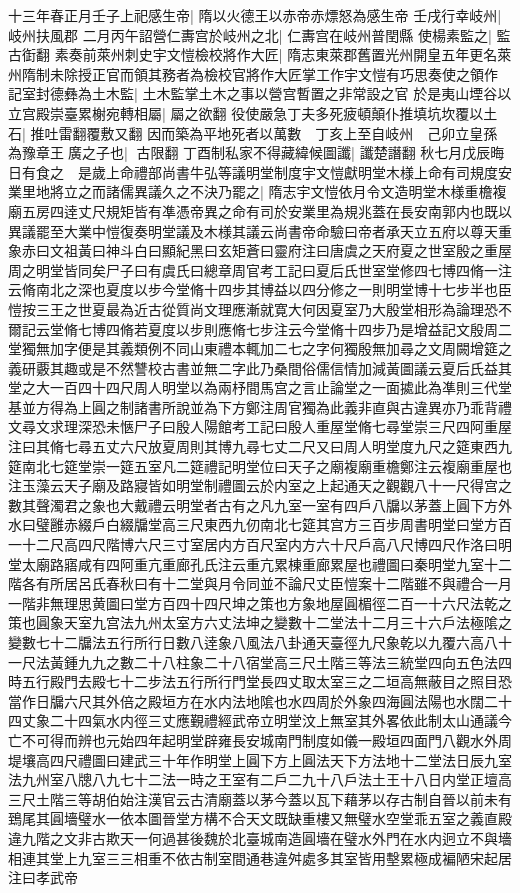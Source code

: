 十三年春正月壬子上祀感生帝|{
	隋以火德王以赤帝赤熛怒為感生帝}
壬戌行幸岐州|{
	岐州扶風郡}
二月丙午詔營仁夀宫於岐州之北|{
	仁夀宫在岐州普閏縣}
使楊素監之|{
	監古衘翻}
素奏前萊州刺史宇文愷檢校將作大匠|{
	隋志東萊郡舊置光州開皇五年更名萊州隋制未除授正官而領其務者為檢校官將作大匠掌工作宇文愷有巧思奏使之領作}
記室封德彝為土木監|{
	土木監掌土木之事以營宫暫置之非常設之官}
於是夷山堙谷以立宫殿崇臺累榭宛轉相屬|{
	屬之欲翻}
役使嚴急丁夫多死疲頓顛仆推填坑坎覆以土石|{
	推吐雷翻覆敷又翻}
因而築為平地死者以萬數　丁亥上至自岐州　己卯立皇孫為豫章王廣之子也|{
	古限翻}
丁酉制私家不得藏緯候圖讖|{
	讖楚譖翻}
秋七月戊辰晦日有食之　是歲上命禮部尚書牛弘等議明堂制度宇文愷獻明堂木様上命有司規度安業里地將立之而諸儒異議久之不決乃罷之|{
	隋志宇文愷依月令文造明堂木様重檐複廟五房四逹丈尺規矩皆有凖憑帝異之命有司於安業里為規兆蓋在長安南郭内也既以異議罷至大業中愷復奏明堂議及木様其議云尚書帝命驗曰帝者承天立五府以尊天重象赤曰文祖黃曰神斗白曰顯紀黑曰玄矩蒼曰靈府注曰唐虞之天府夏之世室殷之重屋周之明堂皆同矣尸子曰有虞氏曰總章周官考工記曰夏后氏世室堂修四七博四脩一注云脩南北之深也夏度以步今堂脩十四步其博益以四分修之一則明堂博十七步半也臣愷按三王之世夏最為近古從質尚文理應漸就寛大何因夏室乃大殷堂相形為論理恐不爾記云堂脩七博四脩若夏度以步則應脩七步注云今堂脩十四步乃是增益記文殷周二堂獨無加字便是其義類例不同山東禮本輒加二七之字何獨殷無加尋之文周闕增筵之義研覈其趣或是不然讐校古書並無二字此乃桑間俗儒信情加減黃圖議云夏后氏益其堂之大一百四十四尺周人明堂以為兩杼間馬宫之言止論堂之一面㨿此為凖則三代堂基並方得為上圓之制諸書所說並為下方鄭注周官獨為此義非直與古違異亦乃乖背禮文尋文求理深恐未愜尸子曰殷人陽館考工記曰殷人重屋堂脩七尋堂崇三尺四阿重屋注曰其脩七尋五丈六尺放夏周則其博九尋七丈二尺又曰周人明堂度九尺之筵東西九筵南北七筵堂崇一筵五室凡二筵禮記明堂位曰天子之廟複廟重檐鄭注云複廟重屋也注玉藻云天子廟及路寢皆如明堂制禮圖云於内室之上起通天之觀觀八十一尺得宫之數其聲濁君之象也大戴禮云明堂者古有之凡九室一室有四戶八牖以茅蓋上圓下方外水曰璧雝赤綴戶白綴牖堂高三尺東西九仞南北七筵其宫方三百步周書明堂曰堂方百一十二尺高四尺階博六尺三寸室居内方百尺室内方六十尺戶高八尺博四尺作洛曰明堂太廟路寤咸有四阿重亢重廊孔氏注云重亢累棟重廊累屋也禮圖曰秦明堂九室十二階各有所居呂氏春秋曰有十二堂與月令同並不論尺丈臣愷案十二階雖不與禮合一月一階非無理思黄圖曰堂方百四十四尺坤之策也方象地屋圓楣徑二百一十六尺法乾之策也圓象天室九宫法九州太室方六丈法坤之變數十二堂法十二月三十六戶法極隂之變數七十二牖法五行所行日數八逹象八風法八卦通天臺徑九尺象乾以九覆六高八十一尺法黃鍾九九之數二十八柱象二十八宿堂高三尺土階三等法三統堂四向五色法四時五行殿門去殿七十二步法五行所行門堂長四丈取太室三之二垣高無蔽目之照目恐當作日牖六尺其外倍之殿垣方在水内法地隂也水四周於外象四海圓法陽也水闊二十四丈象二十四氣水内徑三丈應覲禮經武帝立明堂汶上無室其外畧依此制太山通議今亡不可得而辨也元始四年起明堂辟雍長安城南門制度如儀一殿垣四面門八觀水外周堤壤高四尺禮圖曰建武三十年作明堂上圓下方上圓法天下方法地十二堂法日辰九室法九州室八牕八九七十二法一時之王室有二戶二九十八戶法土王十八日内堂正壇高三尺土階三等胡伯始注漢官云古清廟蓋以茅今蓋以瓦下藉茅以存古制自晉以前未有鵄尾其圓墻璧水一依本圖晉堂方構不合天文既缺重樓又無璧水空堂乖五室之義直殿違九階之文非古欺天一何過甚後魏於北臺城南造圓墻在璧水外門在水内迥立不與墻相連其堂上九室三三相重不依古制室間通巷違舛處多其室皆用墼累極成褊陋宋起居注曰孝武帝}
